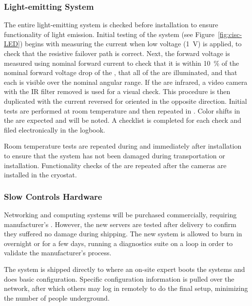 \subsubsection{Light-emitting System}
\label{sec:fdgen-slow-cryo-qc-les}

The entire light-emitting system is checked before installation to ensure functionality of light emission. 
Initial testing of the system (see Figure~\ref{fig:cisc-LED}) begins with
measuring the current when low voltage (\SI{1}{V}) is applied, to check
that the resistive  failover path is correct. Next, the forward voltage is measured using nominal forward current to
check that it is within \SI{10}{\%} of the nominal forward voltage drop of
the , that all of the  are illuminated, and that each  is visible over the nominal angular range. If the  are
infrared, a video camera with the IR filter removed is used for a
visual check. This procedure is then duplicated with the current
reversed for  oriented in the opposite direction. Initial tests are performed at room temperature and then repeated in . Color shifts in the  are expected and will be noted. A checklist is completed for each  check and filed electronically in the  logbook.

Room temperature tests are repeated during and immediately after installation to ensure that the system has not been damaged during transportation or installation. Functionality checks of the  are repeated after the cameras are installed in the cryostat.

\subsubsection{Slow Controls Hardware}
\label{sec:fdsp-slow-cryo-qc-sc-hard}

Networking and computing systems will be purchased commercially, requiring manufacturer's . However, the new servers %
are tested after delivery to confirm they suffered no damage during shipping. The new system is allowed to burn in overnight or for a few days, 
running a diagnostics suite on a loop in order to validate %
the manufacturer's  process.

The system %
is shipped directly to \surf
where an on-site
expert %
boots the systems and does basic
configuration. %
Specific configuration information %
is pulled over
the network, after which others may log in remotely to do the final
setup, minimizing the number of people underground.


